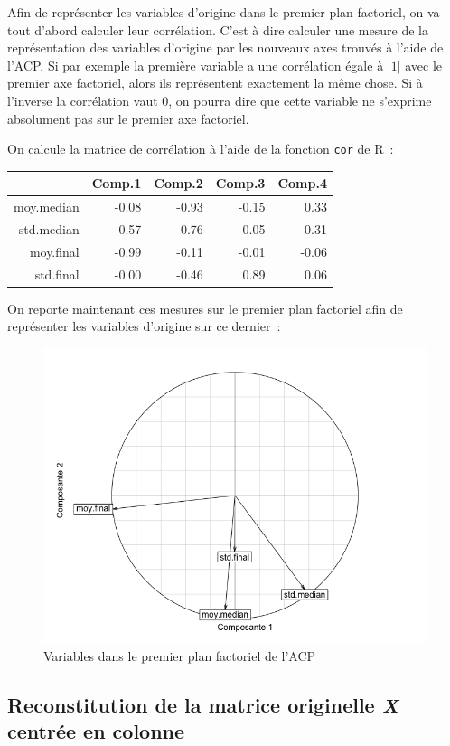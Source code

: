 \documentclass[a4paper,10pt]{report}
\begin{document}
Afin de représenter les variables d'origine dans le premier plan factoriel, on va tout d'abord calculer leur corrélation. C'est à dire calculer une mesure de la représentation des variables d'origine par les nouveaux axes trouvés à l'aide de l'ACP. Si par exemple la première variable a une corrélation égale à $|1|$ avec le premier axe factoriel, alors ils représentent exactement la même chose. Si à l'inverse la corrélation vaut $0$, on pourra dire que cette variable ne s'exprime absolument pas sur le premier axe factoriel.

On calcule la matrice de corrélation à l'aide de la fonction \texttt{cor} de R~:
\begin{table}[ht]
	\centering
	\begin{tabular}{r|rrrr}
		& Comp.1 & Comp.2 & Comp.3 & Comp.4 \\ 
		\hline
		moy.median & -0.08 & -0.93 & -0.15 & 0.33 \\ 
		std.median & 0.57 & -0.76 & -0.05 & -0.31 \\ 
		moy.final & -0.99 & -0.11 & -0.01 & -0.06 \\ 
		std.final & -0.00 & -0.46 & 0.89 & 0.06 \\ 
	\end{tabular}
\end{table}

On reporte maintenant ces mesures sur le premier plan factoriel afin de représenter les variables d'origine sur ce dernier~:
\begin{figure}[H]
	\centering
	\captionsetup{justification=centering, margin=2cm}
	\includegraphics[width=.5\linewidth]{img/2-1-2-variables-premier-plan-factoriel}
	\caption{\scriptsize Variables dans le premier plan factoriel de l'ACP}
	\label{fig:variables_premier_plan_factoriel}
\end{figure}



\subsection{Reconstitution de la matrice originelle \textit{X} centrée en colonne}
\end{document}
